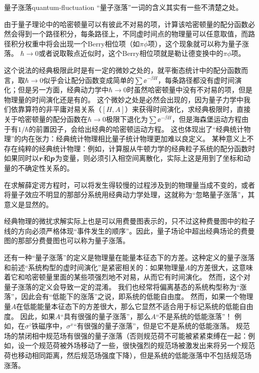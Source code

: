\begin{back}{量子涨落}{quantum-fluctuation}
    “量子涨落”一词的含义其实有一些不清楚之处。

    由于量子理论中的哈密顿量可以有彼此不对易的项，计算该哈密顿量的配分函数必然会得到一个路径积分，每条路径上，不同虚时间点的物理量可以任意取值，而路径积分权重中将会出现一个Berry相位项（如$\pi \dot{\phi}$项），这个现象就可以称为量子涨落。
    $\hbar \to 0$或者说取鞍点近似时，这个Berry相位项就是勒让德变换中的$\pi \dot{\phi}$项。

    这个说法的经典极限此时是有一定的微妙之处的，就平衡态统计中的配分函数而言，取$\hbar \to 0$似乎会让配分函数变成简单的$\sum \ee^{-\beta H}$，每条路径都没有虚时间演化；但是另一方面，经典动力学中$\hbar \to 0$时虽然哈密顿量中没有不对易的项，但是物理量的时间演化还是有的。
    这个微妙之处是必然会出现的，因为量子力学中我们依靠算符的非平庸对易关系（$[H, A]$）来获得时间演化，求经典极限时，直接关于哈密顿量的配分函数在$\hbar \to 0$极限下退化为$\sum \ee^{-\beta H}$，但是海森堡运动方程由于有$1/\hbar$的前置因子，会给出经典的哈密顿运动方程。
    这也体现出了“经典统计物理”的内在张力：经典统计物理相比量子统计物理更加难以良定义。
    某种意义上不存在纯粹的经典统计物理：例如，计算服从牛顿力学的经典粒子系统的配分函数时如果同时以$\vb*{r}$和$\vb*{p}$为变量，则必须引入相空间离散化，实际上这是用到了坐标和动量的不确定性关系的。

    在求解薛定谔方程时，可以将发生得较慢的过程涉及到的物理量当成不变的，或者将量子效应不明显的那部分系统用经典动力学处理，这就称为“忽略量子涨落”，其意义是显然的。

    经典物理的微扰求解实际上也是可以用费曼图表示的，只不过这种费曼图中的粒子线的方向必须严格体现“事件发生的顺序”\cite{hellingsolving}。因此，量子场论中超出经典场论的费曼图的那部分费曼图也可以称为量子涨落。

    还有一种“量子涨落”的定义是物理量在能量本征态下的方差。这种定义的量子涨落和前述“系统构型的虚时间演化”是紧密相关的：如果物理量$A$的方差很大，这意味着它和哈密顿量里面的某些项强烈地不对易，从而它有时间演化。
    然而，这个对量子涨落的定义会导致一定的混淆。
    我们也经常将偏离基态的系统构型称为“涨落”，因此会有“低能下的涨落”之说，即系统的低能自由度。
    然而，如果一个物理量$A$在低能能量本征态下的方差很大，那么它显然不适合用于标记系统的低能自由度。
    因此，如果$A$“具有很强的量子涨落”，那么$A$“不是系统的低能涨落”！
    例如，在$\sigma^z$铁磁序中，$\sigma^x$“有很强的量子涨落”，但是它不是系统的低能涨落。
    规范场的禁闭相中规范场有很强的量子涨落（否则规范荷不可能被紧紧束缚在一起：例如，设一个规范荷被外场移动了一些，很快强烈的规范场被激发出来将另一个规范荷也移动相同距离，然后规范场强度下降），但是系统的低能涨落中不包括规范场涨落。
\end{back}

